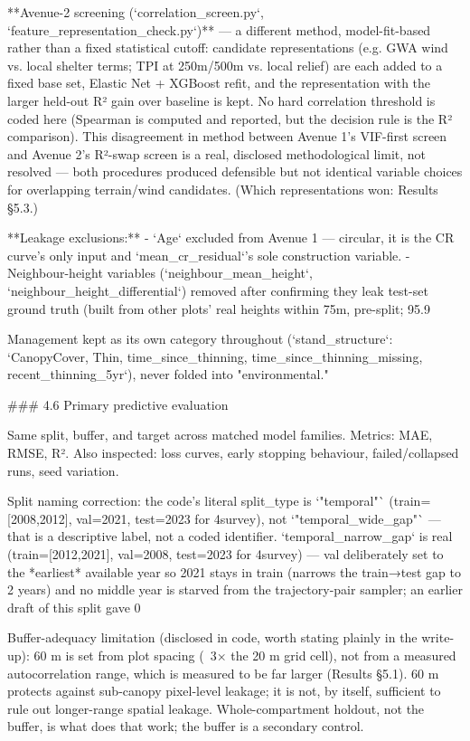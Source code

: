 **Avenue-2 screening (`correlation_screen.py`, `feature_representation_check.py`)** — a different method, model-fit-based rather than a fixed statistical cutoff: candidate representations (e.g. GWA wind vs. local shelter terms; TPI at 250m/500m vs. local relief) are each added to a fixed base set, Elastic Net + XGBoost refit, and the representation with the larger held-out R² gain over baseline is kept. No hard correlation threshold is coded here (Spearman is computed and reported, but the decision rule is the R² comparison). This disagreement in method between Avenue 1's VIF-first screen and Avenue 2's R²-swap screen is a real, disclosed methodological limit, not resolved — both procedures produced defensible but not identical variable choices for overlapping terrain/wind candidates. (Which representations won: Results §5.3.)

**Leakage exclusions:**
- `Age` excluded from Avenue 1 — circular, it is the CR curve's only input and `mean_cr_residual`'s sole construction variable.
- Neighbour-height variables (`neighbour_mean_height`, `neighbour_height_differential`) removed after confirming they leak test-set ground truth (built from other plots' real heights within 75m, pre-split; 95.9%

Management kept as its own category throughout (`stand_structure`: `CanopyCover, Thin, time_since_thinning, time_since_thinning_missing, recent_thinning_5yr`), never folded into "environmental."

### 4.6 Primary predictive evaluation

Same split, buffer, and target across matched model families. Metrics: MAE, RMSE, R². Also inspected: loss curves, early stopping behaviour, failed/collapsed runs, seed variation.

Split naming correction: the code's literal split_type is `"temporal"` (train=[2008,2012], val=2021, test=2023 for 4survey), not `"temporal_wide_gap"` — that is a descriptive label, not a coded identifier. `temporal_narrow_gap` is real (train=[2012,2021], val=2008, test=2023 for 4survey) — val deliberately set to the *earliest* available year so 2021 stays in train (narrows the train→test gap to 2 years) and no middle year is starved from the trajectory-pair sampler; an earlier draft of this split gave 0%

Buffer-adequacy limitation (disclosed in code, worth stating plainly in the write-up): 60 m is set from plot spacing (~3× the 20 m grid cell), not from a measured autocorrelation range, which is measured to be far larger (Results §5.1). 60 m protects against sub-canopy pixel-level leakage; it is not, by itself, sufficient to rule out longer-range spatial leakage. Whole-compartment holdout, not the buffer, is what does that work; the buffer is a secondary control.

